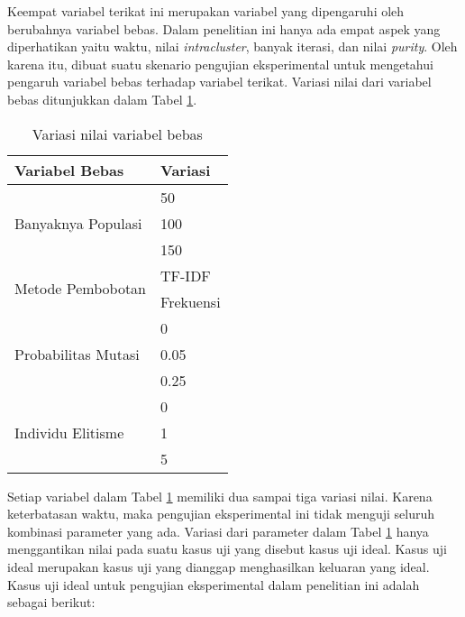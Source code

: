 Keempat variabel terikat ini merupakan variabel yang dipengaruhi oleh berubahnya variabel bebas. Dalam penelitian ini hanya ada empat aspek yang diperhatikan yaitu waktu, nilai \textit{intracluster}, banyak iterasi, dan nilai \textit{purity}. Oleh karena itu, dibuat suatu skenario pengujian eksperimental untuk mengetahui pengaruh variabel bebas terhadap variabel terikat. Variasi nilai dari variabel bebas ditunjukkan dalam Tabel \ref{tbl:testScenario}.

\begin{table}[H]
	\centering
	\caption{Variasi nilai variabel bebas}
	\begin{tabular}{|l|l|}
		\hline
		Variabel Bebas                       & Variasi   \\ \hline
		\multirow{3}{*}{Banyaknya Populasi}  & 50        \\ \cline{2-2} 
		                                     & 100       \\ \cline{2-2} 
		                                     & 150       \\ \hline
		\multirow{2}{*}{Metode Pembobotan}   & TF-IDF    \\ \cline{2-2} 
		                                     & Frekuensi \\ \hline
		\multirow{3}{*}{Probabilitas Mutasi} & 0         \\ \cline{2-2} 
		                                     & 0.05      \\ \cline{2-2} 
		                                     & 0.25      \\ \hline
		\multirow{3}{*}{Individu Elitisme}   & 0         \\ \cline{2-2} 
 		                                     & 1         \\ \cline{2-2} 
		                                     & 5         \\ \hline
\end{tabular}
	\label{tbl:testScenario}
\end{table}

Setiap variabel dalam Tabel \ref{tbl:testScenario} memiliki dua sampai tiga variasi nilai. Karena keterbatasan waktu, maka pengujian eksperimental ini tidak menguji seluruh kombinasi parameter yang ada. Variasi dari parameter dalam Tabel \ref{tbl:testScenario} hanya menggantikan nilai pada suatu kasus uji yang disebut kasus uji ideal. Kasus uji ideal merupakan kasus uji yang dianggap menghasilkan keluaran yang ideal. Kasus uji ideal untuk pengujian eksperimental dalam penelitian ini adalah sebagai berikut:

